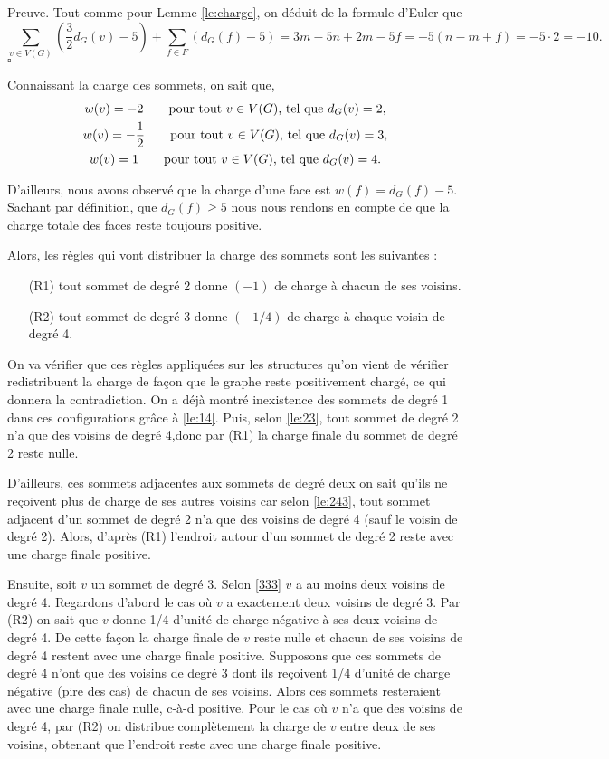 \documentclass[10pt,a4paper]{article}
\newcommand{\ep}{{\hfill $\square$}}
\begin{document}
Preuve.
Tout comme pour Lemme \ref{le:charge}, on déduit de la formule d'Euler que
$$ 
\sum_{v \in V(G)} \left(\frac{3}{2}d_G(v) - 5\right) + \sum_{f\in F} \left(d_G(f) -5\right) = 3m -5n + 2m - 5f = -5(n - m + f) = -5 \cdot 2 = -10.
$$
\ep 

Connaissant la charge des sommets, on sait que,
$$
\gathered
w(v) = -2 \qquad \textrm{pour tout $v \in V(G)$, tel que } d_G(v) = 2,\\
w(v) = -\frac{1}{2} \qquad \textrm{pour tout $v \in V(G)$, tel que } d_G(v) = 3,\\
w(v) =  1 \qquad \textrm{pour tout $v \in V(G)$, tel que } d_G(v) = 4.
\endgathered
$$

D'ailleurs, nous avons observé que la charge d'une face est $w(f) = d_G(f) - 5$. Sachant par définition, que $d_G(f) \geq 5$ nous nous rendons en compte de que la charge totale des faces reste toujours positive.

Alors, les règles qui vont distribuer la charge des sommets sont les suivantes :

\begin{enumerate}
\item[(R1)] tout sommet de degré 2 donne $(-1)$ de charge à chacun de ses voisins.
\item[(R2)] tout sommet de degré 3 donne $(-1/4)$ de charge à chaque voisin de degré 4.
\end{enumerate}

On va vérifier que ces règles appliquées sur les structures qu'on vient de vérifier redistribuent la charge de façon que le graphe reste positivement chargé, ce qui donnera la contradiction. On a déjà montré inexistence des sommets de degré 1 dans ces configurations grâce à \ref{le:14}. Puis, selon \ref{le:23}, tout sommet de degré 2 n'a que des voisins de degré 4,donc par (R1) la charge finale du sommet de degré 2 reste nulle.

D'ailleurs, ces sommets adjacentes aux sommets de degré deux on sait qu'ils ne reçoivent plus de charge de ses autres voisins car selon \ref{le:243}, tout sommet adjacent d'un sommet de degré 2 n'a que des voisins de degré 4 (sauf le voisin de degré 2). Alors, d'après (R1) l'endroit autour d'un sommet de degré 2 reste avec une charge finale positive.


Ensuite, soit $v$ un sommet de degré 3. Selon \ref{333} $v$ a au moins deux voisins de degré 4. Regardons d'abord le cas où $v$ a exactement deux voisins de degré 3. Par (R2) on sait que $v$ donne 1/4 d'unité de charge négative à ses deux voisins de degré 4. De cette façon la charge finale de $v$ reste nulle et chacun de ses voisins de degré 4 restent avec une charge finale positive. Supposons que ces sommets de degré 4 n'ont que des voisins de degré 3 dont ils reçoivent 1/4 d'unité de charge négative (pire des cas) de chacun de ses voisins. Alors ces sommets resteraient avec une charge finale nulle, c-à-d positive. Pour le cas où $v$ n'a que des voisins de degré 4, par (R2) on distribue complètement la charge de $v$ entre deux de ses voisins, obtenant que l'endroit reste avec une charge finale positive.
\end{document}
